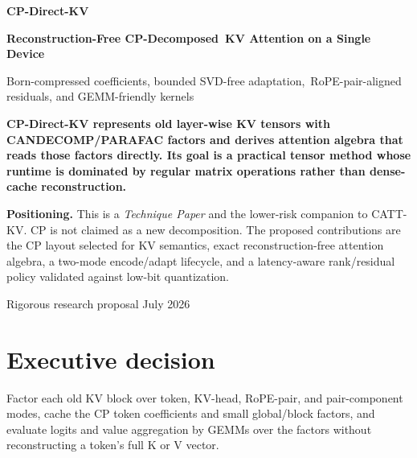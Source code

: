 \documentclass[11pt]{article}
\begin{document}

\begin{titlepage}
\centering
\vspace*{1.25cm}
{\Huge\bfseries\color{accent} CP-Direct-KV\par}
\vspace{0.25cm}
{\Large\bfseries Reconstruction-Free CP-Decomposed\ KV Attention on a Single Device\par}
\vspace{0.45cm}
{\large Born-compressed coefficients, bounded SVD-free adaptation,\ RoPE-pair-aligned residuals, and GEMM-friendly kernels\par}
\vspace{1.0cm}
\begin{tcolorbox}[colback=soft,colframe=accent,width=.94\textwidth,arc=3pt]
\centering\bfseries
CP-Direct-KV represents old layer-wise KV tensors with CANDECOMP/PARAFAC factors and derives
attention algebra that reads those factors directly. Its goal is a practical tensor method whose
runtime is dominated by regular matrix operations rather than dense-cache reconstruction.
\end{tcolorbox}
\vspace{.7cm}
\begin{tcolorbox}[colback=warm,colframe=accent3,width=.94\textwidth,arc=3pt]
\small
\textbf{Positioning.} This is a \emph{Technique Paper} and the lower-risk companion to CATT-KV.
CP is not claimed as a new decomposition. The proposed contributions are the CP layout selected for
KV semantics, exact reconstruction-free attention algebra, a two-mode encode/adapt lifecycle, and a
latency-aware rank/residual policy validated against low-bit quantization.
\end{tcolorbox}
\vfill
{\normalsize Rigorous research proposal \;\textbullet\; July 2026\par}
\end{titlepage}

\tableofcontents
\newpage
{}

\section{Executive decision}

\begin{keybox}[title={One-sentence key idea}]
Factor each old KV block over token, KV-head, RoPE-pair, and pair-component modes, cache the CP token
coefficients and small global/block factors, and evaluate logits and value aggregation by GEMMs over
the factors without reconstructing a token's full K or V vector.
\end{keybox}
\end{document}
